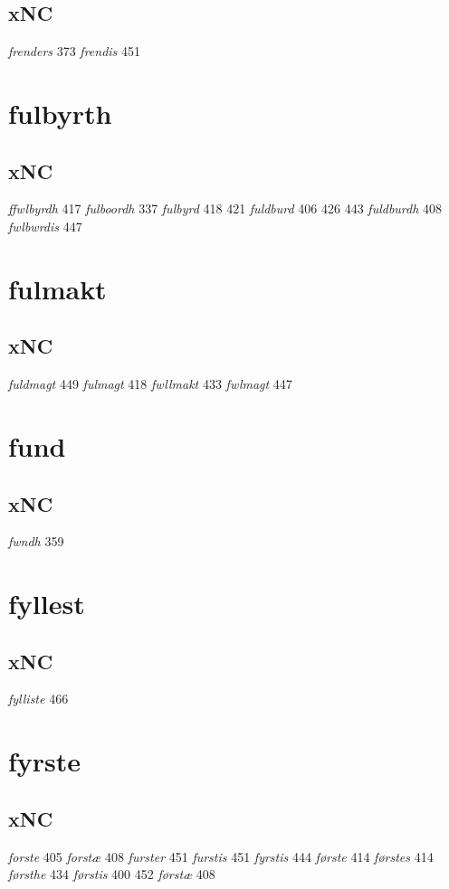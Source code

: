 \documentclass[a4paper,twocolumn]{article}
\begin{document}
\subsection{xNC}
\label{sec:orga4f36e8}
\emph{frenders} 373 \emph{frendis} 451 
\section{fulbyrth}
\label{sec:org942303d}
\subsection{xNC}
\label{sec:org3caebf8}
\emph{ffwlbyrdh} 417 \emph{fulboordh} 337 \emph{fulbyrd} 418 421 \emph{fuldburd} 406 426 443 \emph{fuldburdh} 408 \emph{fwlbwrdis} 447 
\section{fulmakt}
\label{sec:orgb189b3d}
\subsection{xNC}
\label{sec:orgea09b4c}
\emph{fuldmagt} 449 \emph{fulmagt} 418 \emph{fwllmakt} 433 \emph{fwlmagt} 447 
\section{fund}
\label{sec:orgca45c8a}
\subsection{xNC}
\label{sec:org4ca8f57}
\emph{fwndh} 359 
\section{fyllest}
\label{sec:orgb85bce9}
\subsection{xNC}
\label{sec:org1801b48}
\emph{fylliste} 466 
\section{fyrste}
\label{sec:orgddf48df}
\subsection{xNC}
\label{sec:orge4a1ec3}
\emph{forste} 405 \emph{forstæ} 408 \emph{furster} 451 \emph{furstis} 451 \emph{fyrstis} 444 \emph{første} 414 \emph{førstes} 414 \emph{førsthe} 434 \emph{førstis} 400 452 \emph{førstæ} 408 
\end{document}

